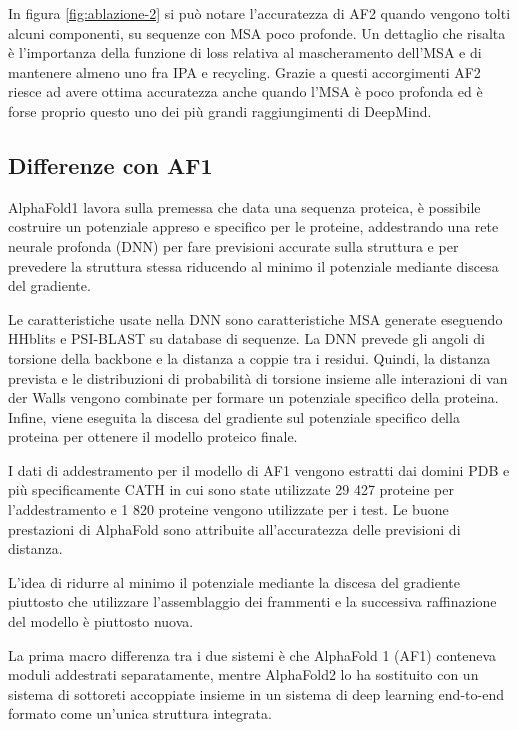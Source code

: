\par In figura \ref{fig:ablazione-2} si può notare l'accuratezza di AF2 quando vengono tolti alcuni componenti, su sequenze con MSA poco profonde. Un dettaglio che risalta è l'importanza della funzione di loss relativa al mascheramento dell'MSA e di mantenere almeno uno fra IPA e recycling. Grazie a questi accorgimenti AF2 riesce ad avere ottima accuratezza anche quando l'MSA è poco profonda ed è forse proprio questo uno dei più grandi raggiungimenti di DeepMind.


\subsection{Differenze con AF1}

AlphaFold1 lavora sulla premessa che data una sequenza proteica, è possibile costruire un potenziale appreso e specifico per le proteine, addestrando una rete neurale profonda (DNN) per fare previsioni accurate sulla struttura e per prevedere la struttura stessa riducendo al minimo il potenziale mediante discesa del gradiente.

\par Le caratteristiche usate nella DNN sono caratteristiche MSA generate eseguendo HHblits e PSI-BLAST su database di sequenze. La DNN prevede gli angoli di torsione della backbone e la distanza a coppie tra i residui. Quindi, la distanza prevista e le distribuzioni di probabilità di torsione insieme alle interazioni di  van der Walls vengono combinate per formare un potenziale specifico della proteina. Infine, viene eseguita la discesa del gradiente sul potenziale specifico della proteina per ottenere il modello proteico finale. 

\par I dati di addestramento per il modello di AF1 vengono estratti dai domini PDB e più specificamente CATH in cui sono state utilizzate 29 427 proteine ​​per l'addestramento e 1 820 proteine ​​vengono utilizzate per i test. Le buone prestazioni di AlphaFold sono attribuite all'accuratezza delle previsioni di distanza\supercite{pakhrin2021deep}.

\par L'idea di ridurre al minimo il potenziale mediante la discesa del gradiente piuttosto che utilizzare l'assemblaggio dei frammenti e la successiva raffinazione del modello è piuttosto nuova.

\par La prima macro differenza tra i due sistemi è che AlphaFold 1 (AF1) conteneva moduli addestrati separatamente, mentre AlphaFold2 lo ha sostituito con un sistema di sottoreti accoppiate insieme in un sistema di deep learning end-to-end formato come un'unica struttura integrata.

